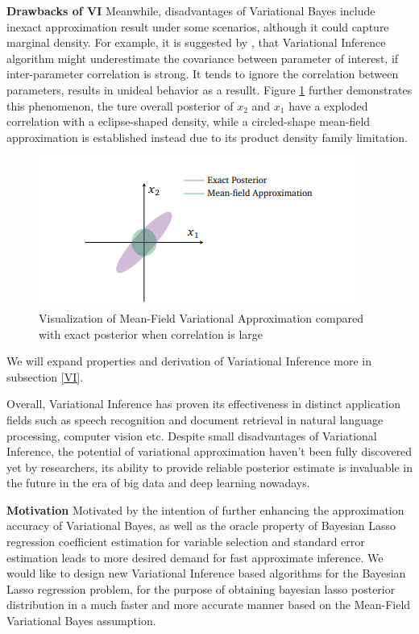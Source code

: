 \textbf{Drawbacks of VI}
Meanwhile, disadvantages of Variational Bayes include inexact approximation result under some scenarios, although it could capture marginal density. For example, it is suggested by \cite{blei_kucukelbir_mcauliffe_2017},
that Variational Inference algorithm might underestimate the covariance between parameter of interest, if inter-parameter correlation is strong. It tends to ignore the correlation between parameters, results in unideal behavior as a resullt. Figure \ref{fig:VIdemo}
further demonstrates this phenomenon, the ture overall posterior of $x_2$ and $x_1$ have a exploded correlation with a eclipse-shaped density, while a circled-shape mean-field approximation is established instead due to its product density family limitation.
\begin{figure}
	\includegraphics[width=\linewidth]{VIdemo}
	\caption{Visualization of Mean-Field Variational Approximation compared with exact posterior when correlation is large}
	\label{fig:VIdemo}
\end{figure}
We will expand properties and derivation of Variational Inference more in subsection \ref{VI}.

Overall, Variational Inference has proven its effectiveness in distinct application fields such as speech recognition and document retrieval in natural language processing, computer vision etc. Despite small disadvantages of Variational Inference, the potential of variational approximation haven't been fully discovered yet by researchers, its ability to provide reliable posterior estimate is invaluable in the future in the era of big data and deep learning nowadays.

\textbf{Motivation}
Motivated by the intention of further enhancing the approximation accuracy of Variational Bayes, as well as the oracle property of Bayesian Lasso regression coefficient estimation for variable selection and standard error estimation leads to more desired demand for fast approximate inference. We would like to design new Variational Inference based algorithms for the Bayesian Lasso regression problem, for the purpose of obtaining bayesian lasso posterior distribution in a much faster and more accurate manner based on the Mean-Field Variational Bayes assumption.

